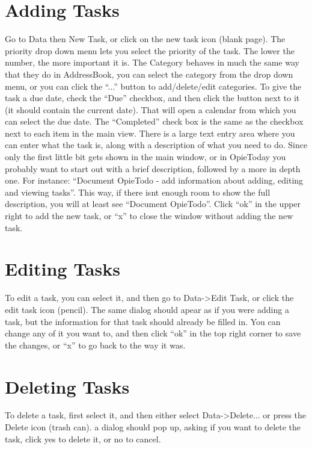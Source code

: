 \documentclass[12pt,letterpaper,oneside, openany]{book} \usepackage[latin1] {inputenc}
\begin{document}
\section{Adding Tasks}

Go to Data then New Task, or click on the new task icon (blank page). The priority drop down menu lets you select the priority of the task. The lower the number, the more important it is. The Category behaves in much the same way that they do in AddressBook, you can select the category from the drop down menu, or you can click the ``...'' button to add/delete/edit categories. To give the task a due date, check the ``Due'' checkbox, and then click the button next to it (it should contain the current date). That will open a calendar from which you can select the due date. The ``Completed'' check box is the same as the checkbox next to each item in the main view. There is a large text entry area where you can enter what the task is, along with a description of what you need to do. Since only the first little bit gets shown in the main window, or in OpieToday you probably want to start out with a brief description, followed by a more in depth one. For instance: ``Document OpieTodo - add information about adding, editing and viewing tasks''. This way, if there isnt enough room to show the full description, you will at least see ``Document OpieTodo''. Click ``ok'' in the upper right to add the new task, or ``x'' to close the window without adding the new task. 


\section{Editing Tasks}

To edit a task, you can select it, and then go to Data->Edit Task, or click the edit task icon (pencil). The same dialog should apear as if you were adding a task, but the information for that task should already be filled in. You can change any of it you want to, and then click ``ok'' in the top right corner to save the changes, or ``x'' to go back to the way it was. 

\section{Deleting Tasks}

To delete a task, first select it, and then either select Data->Delete... or press the Delete icon (trash can). a dialog should pop up, asking if you want to delete the task, click yes to delete it, or no to cancel. 
\end{document}
